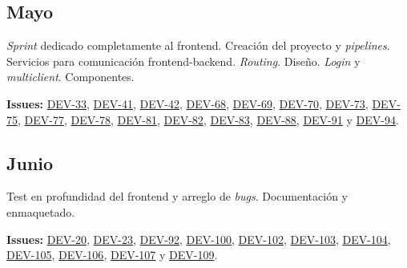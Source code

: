 \subsection{Mayo}
\textit{Sprint} dedicado completamente al frontend. Creación del proyecto y \textit{pipelines}. Servicios para comunicación frontend-backend. \textit{Routing}. Diseño. \textit{Login} y \textit{multiclient}. Componentes.

\bigskip
\textbf{Issues:} \href{https://github.com/harvestcore/tfg/issues/33}{DEV-33}, 
\href{https://github.com/harvestcore/tfg/issues/41}{DEV-41}, 
\href{https://github.com/harvestcore/tfg/issues/42}{DEV-42}, 
\href{https://github.com/harvestcore/tfg/issues/68}{DEV-68}, 
\href{https://github.com/harvestcore/tfg/issues/69}{DEV-69}, 
\href{https://github.com/harvestcore/tfg/issues/70}{DEV-70}, 
\href{https://github.com/harvestcore/tfg/issues/73}{DEV-73}, 
\href{https://github.com/harvestcore/tfg/issues/75}{DEV-75}, 
\href{https://github.com/harvestcore/tfg/issues/77}{DEV-77}, 
\href{https://github.com/harvestcore/tfg/issues/78}{DEV-78}, 
\href{https://github.com/harvestcore/tfg/issues/81}{DEV-81}, 
\href{https://github.com/harvestcore/tfg/issues/82}{DEV-82}, 
\href{https://github.com/harvestcore/tfg/issues/83}{DEV-83}, 
\href{https://github.com/harvestcore/tfg/issues/88}{DEV-88}, 
\href{https://github.com/harvestcore/tfg/issues/91}{DEV-91} y 
\href{https://github.com/harvestcore/tfg/issues/94}{DEV-94}.


\subsection{Junio}
Test en profundidad del frontend y arreglo de \textit{bugs}. Documentación y enmaquetado.

\bigskip
\textbf{Issues:} \href{https://github.com/harvestcore/tfg/issues/20}{DEV-20}, 
\href{https://github.com/harvestcore/tfg/issues/23}{DEV-23}, 
\href{https://github.com/harvestcore/tfg/issues/92}{DEV-92}, 
\href{https://github.com/harvestcore/tfg/issues/100}{DEV-100}, 
\href{https://github.com/harvestcore/tfg/issues/102}{DEV-102}, 
\href{https://github.com/harvestcore/tfg/issues/103}{DEV-103}, 
\href{https://github.com/harvestcore/tfg/issues/104}{DEV-104}, 
\href{https://github.com/harvestcore/tfg/issues/105}{DEV-105}, 
\href{https://github.com/harvestcore/tfg/issues/106}{DEV-106}, 
\href{https://github.com/harvestcore/tfg/issues/107}{DEV-107} y 
\href{https://github.com/harvestcore/tfg/issues/109}{DEV-109}.
